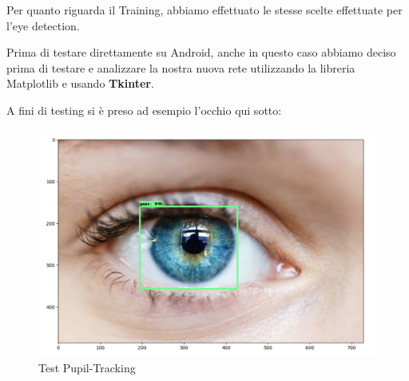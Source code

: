 Per quanto riguarda il Training, abbiamo effettuato le stesse scelte effettuate per l'eye detection.

Prima di testare direttamente su Android, anche in questo caso abbiamo deciso prima di testare e analizzare la nostra nuova rete utilizzando la libreria Matplotlib e usando \textbf{Tkinter}.

A fini di testing si è preso ad esempio l'occhio qui sotto:

\begin{figure}[htbp]
    \centering
    \includegraphics[scale=0.17]{ReteNeurale/PupilDetection/Training/Images/pupilla.png}
    \caption{Test Pupil-Tracking}
    \label{fig:pupil}
\end{figure}